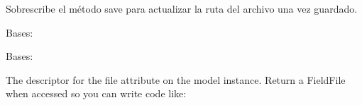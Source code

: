 \documentclass[letterpaper,10pt,spanish]{sphinxmanual}
\begin{document}
\begin{fulllineitems}
\begin{fulllineitems}
\end{fulllineitems}



\begin{fulllineitems}

\pysigstartsignatures
{}
\pysigstopsignatures
\sphinxAtStartPar
Sobrescribe el método save para actualizar la ruta del archivo una vez guardado.

\end{fulllineitems}



\begin{fulllineitems}

\pysigstartsignatures
{}
\pysigstopsignatures
\sphinxAtStartPar
Bases: 

\end{fulllineitems}



\begin{fulllineitems}

\pysigstartsignatures
{}
\pysigstopsignatures
\sphinxAtStartPar
Bases: 

\end{fulllineitems}



\begin{fulllineitems}

\pysigstartsignatures
{}
\pysigstopsignatures
\sphinxAtStartPar
The descriptor for the file attribute on the model instance. Return a
FieldFile when accessed so you can write code like:

\begin{sphinxVerbatim}[commandchars=\\\{\}]
   
  
\end{sphinxVerbatim}


\end{fulllineitems}
\end{fulllineitems}
\end{document}
